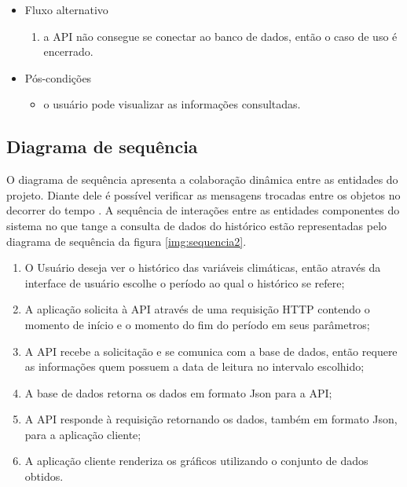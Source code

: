 \begin{itemize}
\begin{itemize}
			\item Fluxo alternativo
		    	\begin{enumerate}
			        \item a API não consegue se conectar ao banco de dados, então o caso de uso é encerrado.
		    	\end{enumerate}
    				    	
		    \item Pós-condições
			    \begin{itemize}
        			\item o usuário pode visualizar as informações consultadas.
		    	\end{itemize}
		\end{itemize}
\end{itemize}


\subsection{Diagrama de sequência} \label{subsec:diagSeq}

O diagrama de sequência apresenta a colaboração dinâmica entre as entidades do projeto. Diante dele é possível verificar as mensagens trocadas entre os objetos no decorrer do tempo \cite{SITESEQ}. A sequência de interações entre as entidades componentes do sistema no que tange a consulta de dados do histórico estão representadas pelo diagrama de sequência da figura \ref{img:sequencia2}.

\newpage



\begin{enumerate}
	\item O Usuário deseja ver o histórico das variáveis climáticas, então através da interface de usuário escolhe o período ao qual o histórico se refere;
	\item A aplicação solicita à API através de uma requisição HTTP contendo o momento de início e o momento do fim do período em seus parâmetros;     			\item A API recebe a solicitação e se comunica com a base de dados, então requere as informações quem possuem a data de leitura no intervalo escolhido;
	\item A base de dados retorna os dados em formato Json para a API;
	\item A API responde à requisição retornando os dados, também em formato Json, para a aplicação cliente;
	\item A aplicação cliente renderiza os gráficos utilizando o conjunto de dados obtidos.
\end{enumerate}

